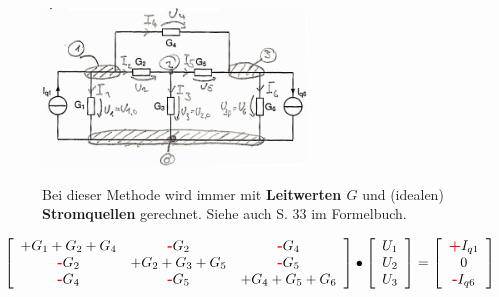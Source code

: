 \begin{figure}[ht]
  \begin{minipage}[lt]{7.5 cm}
    \includegraphics[width=7cm]{pics/dcnet/knotenpotentialmethode} 
  \end{minipage}
  \begin{minipage}[rt]{9.35 cm} %
  Bei dieser Methode wird immer mit \textbf{Leitwerten $G$} und (idealen) \textbf{Stromquellen}
gerechnet. Siehe auch S. 33 im Formelbuch.
  \end{minipage}
\end{figure}
$\left[\begin{array}{ccc}
+G_1+G_2+G_4 &\text{\textbf{\textcolor{red}{-}}}G_2 &\text{\textbf{\textcolor{red}{-}}}G_4\\
\text{\textbf{\textcolor{red}{-}}}G_2 &+G_2+G_3+G_5
&\text{\textbf{\textcolor{red}{-}}}G_5\\ 
\text{\textbf{\textcolor{red}{-}}}G_4 &\text{\textbf{\textcolor{red}{-}}}G_5 &+G_4+G_5+G_6
\end{array}\right] \bullet 
\left[\begin{array}{l}U_1\\U_2\\U_3\end{array}\right] = 
\left[\begin{array}{c}\text{\textbf{\textcolor{red}{+}}}I_{q1}\\0\\
\text{\textbf{\textcolor{red}{-}}}I_{q6}\end{array}\right]$

